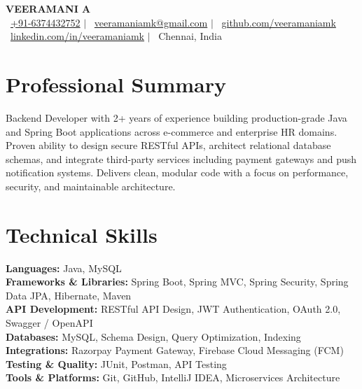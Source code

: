 \documentclass[letterpaper,11pt]{article}
\begin{document}

\begin{center}
\textbf{\Huge VEERAMANI A} \\[5pt]
\small
\faPhone\ \href{tel:+916374432752}{+91-6374432752} \quad $|$ \quad
\faEnvelope\ \href{mailto:veeramaniamk@gmail.com}{veeramaniamk@gmail.com} \quad $|$ \quad
\faGithub\ \href{https://github.com/veeramaniamk}{github.com/veeramaniamk} \\[3pt]
\vspace{4pt}
\faLinkedin\ \href{https://linkedin.com/in/veeramaniamk}{linkedin.com/in/veeramaniamk} \quad $|$ \quad
\faMapMarker*\ Chennai, India
\end{center}

\section{Professional Summary}

Backend Developer with 2+ years of experience building production-grade Java and Spring Boot applications across e-commerce and enterprise HR domains. Proven ability to design secure RESTful APIs, architect relational database schemas, and integrate third-party services including payment gateways and push notification systems. Delivers clean, modular code with a focus on performance, security, and maintainable architecture.


\section{Technical Skills}

\textbf{Languages:} Java, MySQL \\
\textbf{Frameworks \& Libraries:} Spring Boot, Spring MVC, Spring Security, Spring Data JPA, Hibernate, Maven \\
\textbf{API Development:} RESTful API Design, JWT Authentication, OAuth 2.0, Swagger / OpenAPI \\
\textbf{Databases:} MySQL, Schema Design, Query Optimization, Indexing \\
\textbf{Integrations:} Razorpay Payment Gateway, Firebase Cloud Messaging (FCM) \\
\textbf{Testing \& Quality:} JUnit, Postman, API Testing \\
\textbf{Tools \& Platforms:} Git, GitHub, IntelliJ IDEA, Microservices Architecture \\
\end{document}

